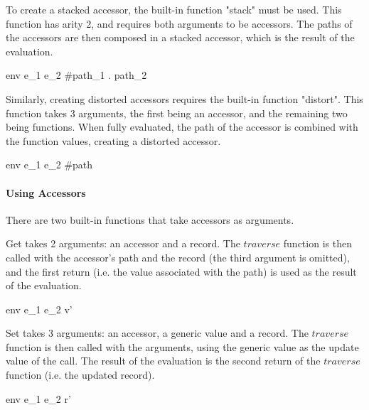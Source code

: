 \documentclass{article}
\begin{document}
To create a stacked accessor, the built-in function "stack" must be used.
This function has arity 2, and requires both arguments to be accessors.
The paths of the accessors are then composed in a stacked accessor, which is the result of the evaluation.

    {\mbox{env} \vdash e_1 \; e_2 \Downarrow \#path_1 \; . \; path_2}

Similarly, creating distorted accessors requires the built-in function "distort".
This function takes 3 arguments, the first being an accessor, and the remaining two being functions.
When fully evaluated, the path of the accessor is combined with the function values, creating a distorted accessor.

    {\mbox{env} \vdash e_1 \; e_2 \Downarrow \#path \; [v_1, \; v_2]}

\paragraph{Using Accessors}

There are two built-in functions that take accessors as arguments.


Get takes 2 arguments: an accessor and a record.
The $traverse$ function is then called with the accessor's path and the record (the third argument is omitted), and the first return (i.e. the value associated with the path) is used as the result of the evaluation.

    {\mbox{env} \vdash e_1 \; e_2 \Downarrow v'}

Set takes 3 arguments: an accessor, a generic value and a record.
The $traverse$ function is then called with the arguments, using the generic value as the update value of the call.
The result of the evaluation is the second return of the $traverse$ function (i.e. the updated record).

    {\mbox{env} \vdash e_1 \; e_2 \Downarrow r'}
\end{document}
